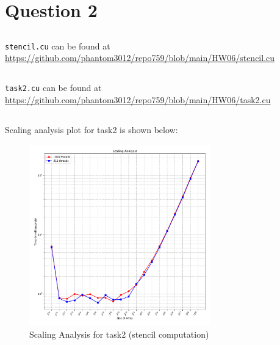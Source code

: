 \documentclass[12pt]{article}
\begin{document}
\clearpage

\section{Question 2}
\subsection{}
\texttt{stencil.cu} can be found at \url{https://github.com/phantom3012/repo759/blob/main/HW06/stencil.cu}
\subsection{}
\texttt{task2.cu} can be found at \url{https://github.com/phantom3012/repo759/blob/main/HW06/task2.cu}
\subsection{}
Scaling analysis plot for task2 is shown below:
\begin{figure}[ht]
    \centering
    \includegraphics[width=0.7\textwidth]{task2.pdf}
    \caption{Scaling Analysis for task2 (stencil computation)}
\end{figure}
\end{document}
